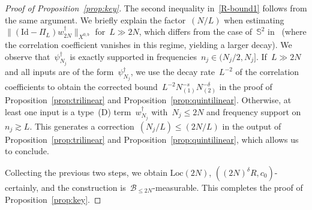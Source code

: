 \documentclass[11pt,reqno,english]{amsart}
\numberwithin{equation}{section}
\theoremstyle{plain}
\theoremstyle{definition}
\theoremstyle{remark}
\begin{document}
\begin{proof}[Proof of Proposition~\ref{prop:key}]
	The second inequality in~\eqref{R-bound1} follows from the same argument. We briefly explain the factor~$(N/L)$ when estimating~$\|(\mathrm{Id}-\Pi_{L})w_{2N}^{\dag}\|_{X^{0,b}}$ for~$L\gg 2N$, which differs from the case of~$\mathbb{S}^2$ in~\cite{BCST24} (where the correlation coefficient vanishes in this regime, yielding a larger decay). We observe that~$\psi_{N_j}^{\dag}$ is exactly supported in frequencies~$n_j\in(N_j/2,N_j]$. If~$L\gg 2N$ and all inputs are of the form~$\psi_{N_j}^{\dag}$, we use the decay rate~$L^{-2}$ of the correlation coefficients to obtain the corrected bound~$L^{-2}N_{(1)}^{-s}N_{(2)}^{-\delta}$ in the proof of Proposition~\ref{prop:trilinear} and Proposition~\ref{prop:quintilinear}. Otherwise, at least one input is a type~(D) term~$w_{N_j}^{\dag}$ with~$N_j\leq 2N$ and frequency support on~$n_j\gtrsim L$. This generates a correction~$(N_j/L)\leq (2N/L)$ in the output of Proposition~\ref{prop:trilinear} and Proposition~\ref{prop:quintilinear}, which allows us to conclude.
\medskip

	Collecting the previous two steps, we obtain $\mathrm{Loc}(2N)$, $((2N)^{\delta}R,c_0)$-certainly, and the construction is~$\mathcal{B}_{\le 2N}$-measurable. This completes the proof of Proposition~\ref{prop:key}.
\end{proof}
\end{document}

